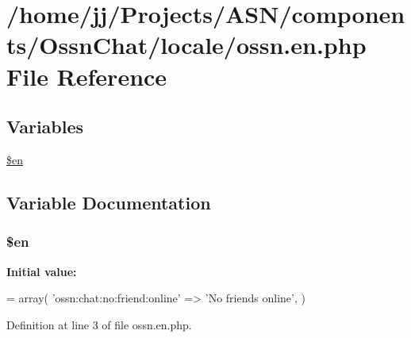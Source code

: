 \hypertarget{components_2_ossn_chat_2locale_2ossn_8en_8php}{}\section{/home/jj/\+Projects/\+A\+S\+N/components/\+Ossn\+Chat/locale/ossn.en.\+php File Reference}
\label{components_2_ossn_chat_2locale_2ossn_8en_8php}
\subsection*{Variables}
\begin{DoxyCompactItemize}
\item 
\hyperlink{components_2_ossn_chat_2locale_2ossn_8en_8php_a48abc714dfb71c8fffa83cf49f452115}{\$en}
\end{DoxyCompactItemize}


\subsection{Variable Documentation}
\subsubsection[{\texorpdfstring{\$en}{$en}}]{\setlength{\rightskip}{0pt plus 5cm}\$en}\hypertarget{components_2_ossn_chat_2locale_2ossn_8en_8php_a48abc714dfb71c8fffa83cf49f452115}{}\label{components_2_ossn_chat_2locale_2ossn_8en_8php_a48abc714dfb71c8fffa83cf49f452115}
{\bfseries Initial value\+:}
\begin{DoxyCode}
= array(
    \textcolor{stringliteral}{'ossn:chat:no:friend:online'} => \textcolor{stringliteral}{'No friends online'},
)
\end{DoxyCode}


Definition at line 3 of file ossn.\+en.\+php.

